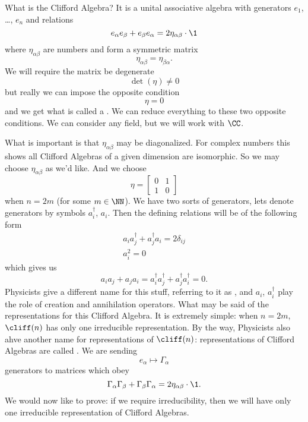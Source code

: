 What is the Clifford Algebra? It is a unital associative algebra
with generators $e_{1}$, \dots, $e_{n}$ and relations
\begin{equation}
e_{\alpha}e_{\beta}+e_{\beta}e_{\alpha}=2\eta_{\alpha\beta}\cdot\1
\end{equation}
where $\eta_{\alpha\beta}$ are numbers and form a symmetric
matrix
\begin{equation}
\eta_{\alpha\beta}=\eta_{\beta\alpha}.
\end{equation}
We will require the matrix be degenerate
\begin{equation}
\det(\eta)\not=0
\end{equation}
but really we can impose the opposite condition
\begin{equation}
\eta=0
\end{equation}
and we get what is called a . We can
reduce everything to these two opposite conditions. We can
consider any field, but we will work with $\CC$.

What is important is that $\eta_{\alpha\beta}$ may be
diagonalized. For complex numbers this shows all Clifford
Algebras of a given dimension are isomorphic. So we may choose
$\eta_{\alpha\beta}$ as we'd like. And we choose
\begin{equation}
\eta = \begin{bmatrix} 0 & 1\\
1 & 0
\end{bmatrix}
\end{equation}
when $n=2m$ (for some $m\in\NN$). We have two sorts of
generators, lets denote generators by symbols $a^{\dagger}_{i}$,
$a_{i}$. Then the defining relations will be of the following
form
\begin{subequations}
\begin{align}
a_{i}a_{j}^{\dagger}+a_{j}^{\dagger}a_{i}=2\delta_{ij}\\
a_{i}^{2}=0
\end{align}
\end{subequations}
which gives us
\begin{equation}
a_{i}a_{j}+a_{j}a_{i}=a_{i}^{\dagger}a_{j}^{\dagger}+a_{j}^{\dagger}a_{i}^{\dagger}=0.
\end{equation}
Physicists give a different name for this stuff, referring to it
as , and $a_{i}$,
$a_{i}^{\dagger}$ play the role of creation and annihilation
operators. What may be said of the representations for this
Clifford Algebra. It is extremely simple: when $n=2m$, $\cliff(n)$
has only one irreducible representation. By the way, Physicists
also ahve another name for representations of $\cliff(n)$:
representations of Clifford Algebras are called . We are sending
\begin{equation}
e_{\alpha}\mapsto\Gamma_{\alpha}
\end{equation}
generators to matrices which obey
\begin{equation}
\Gamma_{\alpha}\Gamma_{\beta}+\Gamma_{\beta}\Gamma_{\alpha}=2\eta_{\alpha\beta}\cdot\1.
\end{equation}
We would now like to prove: if we require irreducibility, then we
will have only one irreducible representation of Clifford
Algebras.


